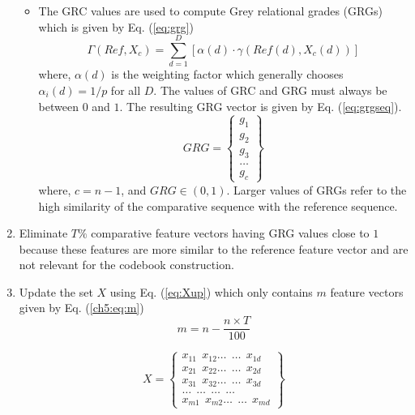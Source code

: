\begin{enumerate}
\begin{itemize}
\item The GRC values are used to compute Grey relational grades (GRGs) which is given by Eq. (\ref{eq:grg})
\begin{equation} \label{eq:grg}
\Gamma(Ref, X_{c})= \sum_{d=1}^D[\alpha(d) \cdot \gamma(Ref(d), X_{c}(d))]
\end{equation}
where, $\alpha(d)$ is the weighting factor which  generally chooses  $\alpha_i(d) =1/p$ for all $D$. The values of GRC and GRG must always be between $0$ and $1$.
The resulting GRG vector is given by Eq. (\ref{eq:grgseq}).
\begin{equation}\label{eq:grgseq}
GRG=\left\{\begin{array}{c}g_{1} \\ 
g_{2} \\
g_{3}  \\
\dots   \\
g_{c} 
\end{array}\right\}
\end{equation}
where, $c=n-1$, and $GRG \in (0,1)$. Larger values of GRGs refer to the high similarity of the comparative sequence with the reference sequence.
\end{itemize}

\item Eliminate  $T\%$ comparative feature vectors having GRG  values close to $1$ because these features are more similar to the reference feature vector and are not relevant for the codebook construction. 

\item Update the set $X$ using Eq. (\ref{eq:Xup}) which only contains $m$ feature vectors   given by Eq. (\ref{ch5:eq:m}) 
\begin{equation}\label{ch5:eq:m}
m=n-\frac{n \times T}{100}
\end{equation}


\begin{equation}\label{eq:Xup}
X=\left\{\begin{array}{c}
x_{11} \  \ x_{12} \dots \ \    \dots \ \ x_{1d}\\ 
x_{21} \ \ x_{22}\dots  \ \     \dots \ \ x_{2d}\\
x_{31}  \ \ x_{32} \dots \ \    \dots \ \ x_{3d}\\
\dots \ \ \dots \ \    \dots \ \ \dots  \\
x_{m1} \ \ x_{m2} \dots \ \      \dots \ \ x_{md}
\end{array}\right\}
\end{equation} 


\end{enumerate}
